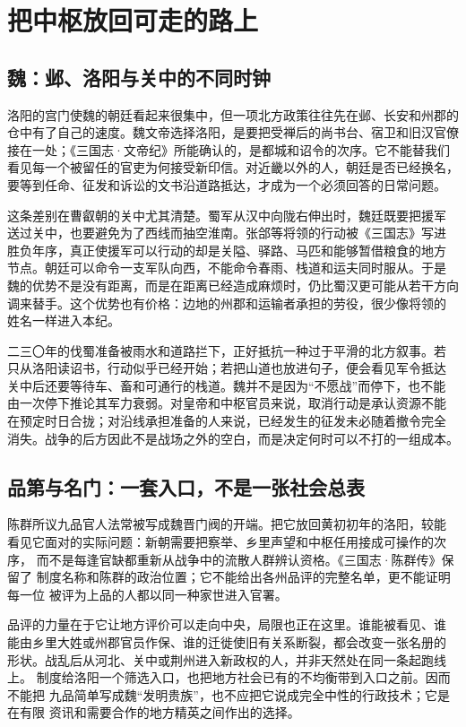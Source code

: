 \section{把中枢放回可走的路上}

\subsection{魏：邺、洛阳与关中的不同时钟}

洛阳的宫门使魏的朝廷看起来很集中，但一项北方政策往往先在邺、长安和州郡的
仓中有了自己的速度。魏文帝选择洛阳，是要把受禅后的尚书台、宿卫和旧汉官僚
接在一处；《三国志·文帝纪》所能确认的，是都城和诏令的次序。它不能替我们
看见每一个被留任的官吏为何接受新印信。对近畿以外的人，朝廷是否已经换名，
要等到任命、征发和诉讼的文书沿道路抵达，才成为一个必须回答的日常问题。

这条差别在曹叡朝的关中尤其清楚。蜀军从汉中向陇右伸出时，魏廷既要把援军
送过关中，也要避免为了西线而抽空淮南。张郃等将领的行动被《三国志》写进
胜负年序，真正使援军可以行动的却是关隘、驿路、马匹和能够暂借粮食的地方
节点。朝廷可以命令一支军队向西，不能命令春雨、栈道和运夫同时服从。于是
魏的优势不是没有距离，而是在距离已经造成麻烦时，仍比蜀汉更可能从若干方向
调来替手。这个优势也有价格：边地的州郡和运输者承担的劳役，很少像将领的
姓名一样进入本纪。

二三〇年的伐蜀准备被雨水和道路拦下，正好抵抗一种过于平滑的北方叙事。若
只从洛阳读诏书，行动似乎已经开始；若把山道也放进句子，便会看见军令抵达
关中后还要等待车、畜和可通行的栈道。魏并不是因为“不愿战”而停下，也不能
由一次停下推论其军力衰弱。对皇帝和中枢官员来说，取消行动是承认资源不能
在预定时日合拢；对沿线承担准备的人来说，已经发生的征发未必随着撤令完全
消失。战争的后方因此不是战场之外的空白，而是决定何时可以不打的一组成本。

\subsection{品第与名门：一套入口，不是一张社会总表}

陈群所议九品官人法常被写成魏晋门阀的开端。把它放回黄初初年的洛阳，较能
看见它面对的实际问题：新朝需要把察举、乡里声望和中枢任用接成可操作的次序，
而不是每逢官缺都重新从战争中的流散人群辨认资格。《三国志·陈群传》保留了
制度名称和陈群的政治位置；它不能给出各州品评的完整名单，更不能证明每一位
被评为上品的人都以同一种家世进入官署。

品评的力量在于它让地方评价可以走向中央，局限也正在这里。谁能被看见、谁
能由乡里大姓或州郡官员作保、谁的迁徙使旧有关系断裂，都会改变一张名册的
形状。战乱后从河北、关中或荆州进入新政权的人，并非天然处在同一条起跑线上。
制度给洛阳一个筛选入口，也把地方社会已有的不均衡带到入口之前。因而不能把
九品简单写成魏“发明贵族”，也不应把它说成完全中性的行政技术；它是在有限
资讯和需要合作的地方精英之间作出的选择。


